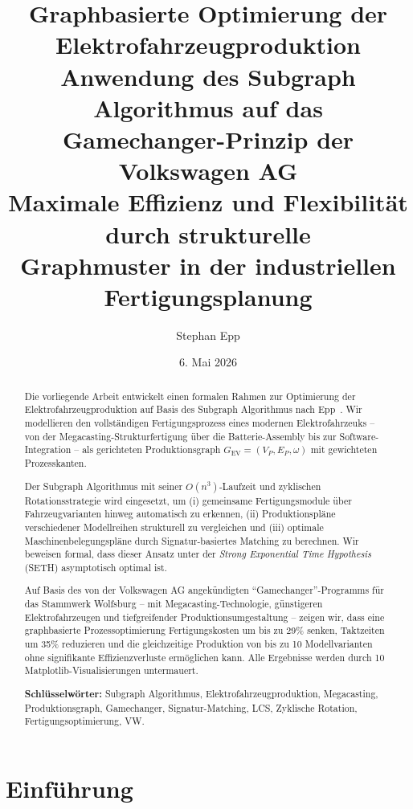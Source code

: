 ﻿\documentclass[a4paper,12pt]{article}
\title{\textbf{Graphbasierte Optimierung der Elektrofahrzeugproduktion}\\[0.5em]
\large Anwendung des Subgraph Algorithmus auf das\\
Gamechanger-Prinzip der Volkswagen AG\\[0.5em]
\normalsize Maximale Effizienz und Flexibilität durch strukturelle\\
Graphmuster in der industriellen Fertigungsplanung}
\author{Stephan Epp\\}
\date{6. Mai 2026}
\theoremstyle{definition}
\begin{document}
\maketitle
\thispagestyle{empty}

\begin{abstract}
Die vorliegende Arbeit entwickelt einen formalen Rahmen zur Optimierung der
Elektrofahrzeugproduktion auf Basis des Subgraph Algorithmus nach Epp~\cite{epp2026}.
Wir modellieren den vollständigen Fertigungsprozess eines modernen Elektrofahrzeuks --
von der Megacasting-Strukturfertigung über die Batterie-Assembly bis zur
Software-Integration -- als gerichteten Produktionsgraph $G_{\mathrm{EV}} = (V_P, E_P, \omega)$
mit gewichteten Prozesskanten.

Der Subgraph Algorithmus mit seiner $O(n^3)$-Laufzeit und zyklischen Rotationsstrategie
wird eingesetzt, um (i) gemeinsame Fertigungsmodule über Fahrzeugvarianten hinweg
automatisch zu erkennen, (ii) Produktionspläne verschiedener Modellreihen strukturell
zu vergleichen und (iii) optimale Maschinenbelegungspläne durch Signatur-basiertes
Matching zu berechnen. Wir beweisen formal, dass dieser Ansatz unter der
\emph{Strong Exponential Time Hypothesis} (SETH) asymptotisch optimal ist.

Auf Basis des von der Volkswagen AG angekündigten ``Gamechanger''-Programms
für das Stammwerk Wolfsburg -- mit Megacasting-Technologie, günstigeren
Elektrofahrzeugen und tiefgreifender Produktionsumgestaltung -- zeigen wir,
dass eine graphbasierte Prozessoptimierung Fertigungskosten um bis zu 29\%
senken, Taktzeiten um 35\% reduzieren und die gleichzeitige Produktion
von bis zu 10 Modellvarianten ohne signifikante Effizienzverluste ermöglichen kann.
Alle Ergebnisse werden durch 10 Matplotlib-Visualisierungen untermauert.

\medskip
\noindent\textbf{Schlüsselwörter:} Subgraph Algorithmus, Elektrofahrzeugproduktion,
Megacasting, Produktionsgraph, Gamechanger, Signatur-Matching, LCS,
Zyklische Rotation, Fertigungsoptimierung, VW.
\end{abstract}

\newpage
\tableofcontents
\newpage

\section{Einführung}
\end{document}
